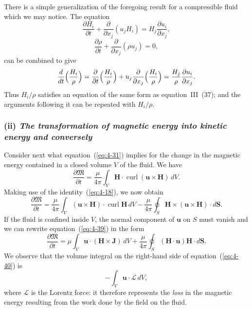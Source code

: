 There is a simple generalization of the foregoing result for a compressible fluid which we may notice. The equation
\begin{equation}
\label{eq:4-35}
\frac{\partial H_i}{\partial t}+\frac{\partial}{\partial x_j}(u_j H_i) = H_j\frac{\partial u_i}{\partial x_j},
\end{equation}
\begin{equation}
\label{eq:4-36}
\frac{\partial\rho}{\partial t}+\frac{\partial}{\partial x_j}(\rho u_j) = 0,
\end{equation}
can be combined to give
\begin{equation}
\label{eq:4-37}
\frac{d}{dt}\Bigl(\frac{H_i}{\rho}\Bigr) = \frac{\partial}{\partial t}\Bigl(\frac{H_i}{\rho}\Bigr)+u_j\frac{\partial}{\partial x_j}\Bigl(\frac{H_i}{\rho}\Bigr) = \frac{H_j}{\rho}\frac{\partial u_i}{\partial x_j}.
\end{equation}
Thus $H_i/\rho$ satisfies an equation of the same form as equation~III~(37); and the arguments following it can be repeated with $H_i/\rho$.

\subsubsection*{(ii) \emph{The transformation of magnetic energy into kinetic energy and conversely}}

Consider next what equation~(\ref{eq:4-31}) implies for the change in the magnetic energy contained in a closed volume $V$ of the fluid. We have
\begin{equation}
\label{eq:4-38}
\frac{\partial\mathfrak{M}}{\partial t} = \frac{\mu}{4\pi}\int_V \mathbf{H}\cdot\operatorname{curl}(\mathbf{u}\times\mathbf{H})\,dV.
\end{equation}
Making use of the identity~(\ref{eq:4-18}), we now obtain
\begin{equation}
\label{eq:4-39}
\frac{\partial\mathfrak{M}}{\partial t} = \frac{\mu}{4\pi}\int_V (\mathbf{u}\times\mathbf{H})\cdot\operatorname{curl}\mathbf{H}\,dV - \frac{\mu}{4\pi}\oint_S \mathbf{H}\times(\mathbf{u}\times\mathbf{H})\cdot d\mathbf{S}.
\end{equation}
If the fluid is confined inside $V$, the normal component of $\mathbf{u}$ on $S$ must vanish and we can rewrite equation~(\ref{eq:4-39}) in the form
\begin{equation}
\label{eq:4-40}
\frac{\partial\mathfrak{M}}{\partial t} = \mu\int_V \mathbf{u}\cdot(\mathbf{H}\times\mathbf{J})\,dV + \frac{\mu}{4\pi}\oint_S (\mathbf{H}\cdot\mathbf{u})\mathbf{H}\cdot d\mathbf{S}.
\end{equation}
We observe that the volume integral on the right-hand side of equation~(\ref{eq:4-40}) is
\begin{equation}
\label{eq:4-41}
-\int_V \mathbf{u}\cdot\boldsymbol{\mathscr{L}}\,dV,
\end{equation}
where $\boldsymbol{\mathscr{L}}$ is the Lorentz force: it therefore represents the \emph{loss} in the magnetic energy resulting from the work done by the field on the fluid.


